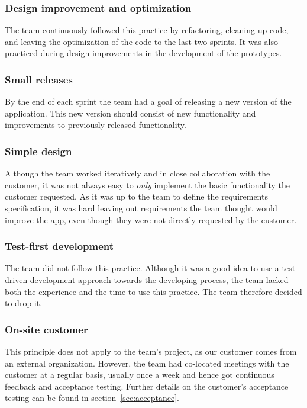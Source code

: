 \subsubsection{Design improvement and optimization}
The team continuously followed this practice by refactoring, cleaning up code, and leaving the optimization of the code to the last two sprints. It was also practiced during design improvements in the development of the prototypes.
 
\subsubsection{Small releases}
By the end of each sprint the team had a goal of releasing a new version of the application. This new version should consist of new functionality and improvements to previously released functionality.

\subsubsection{Simple design}
Although the team worked iteratively and in close collaboration with the customer, it was not always easy to \emph{only} implement the basic functionality the customer requested. As it was up to the team to define the requirements specification, it was hard leaving out requirements the team thought would improve the app, even though they were not directly requested by the customer.


\subsubsection{Test-first development}
The team did not follow this practice. Although it was a good idea to use a test-driven development approach towards the developing process, the team lacked both the experience and the time to use this practice. The team therefore decided to drop it.

\subsubsection{On-site customer}
This principle does not apply to the team's project, as our customer comes from an external organization. However, the team had co-located meetings with the customer at a regular basis, usually once a week and hence got continuous feedback and acceptance testing. Further details on the customer's acceptance testing can be found in section~\ref{sec:acceptance}.
